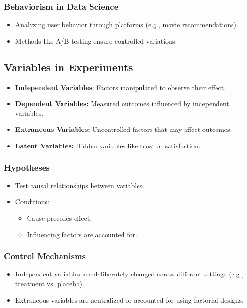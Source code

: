 \subsubsection{Behaviorism in Data Science}
\begin{itemize}
    \item Analyzing user behavior through platforms (e.g., movie recommendations).
    \item Methods like A/B testing ensure controlled variations.
\end{itemize}

\subsection{Variables in Experiments}
\begin{itemize}
    \item \textbf{Independent Variables:} Factors manipulated to observe their effect.
    \item \textbf{Dependent Variables:} Measured outcomes influenced by independent variables.
    \item \textbf{Extraneous Variables:} Uncontrolled factors that may affect outcomes.
    \item \textbf{Latent Variables:} Hidden variables like trust or satisfaction.
\end{itemize}

\subsubsection{Hypotheses}
\begin{itemize}
    \item Test causal relationships between variables.
    \item Conditions:
    \begin{itemize}
        \item Cause precedes effect.
        \item Influencing factors are accounted for.
    \end{itemize}
\end{itemize}

\subsubsection{Control Mechanisms}
\begin{itemize}
    \item Independent variables are deliberately changed across different settings (e.g., treatment vs. placebo).
    \item Extraneous variables are neutralized or accounted for using factorial designs.
\end{itemize}


